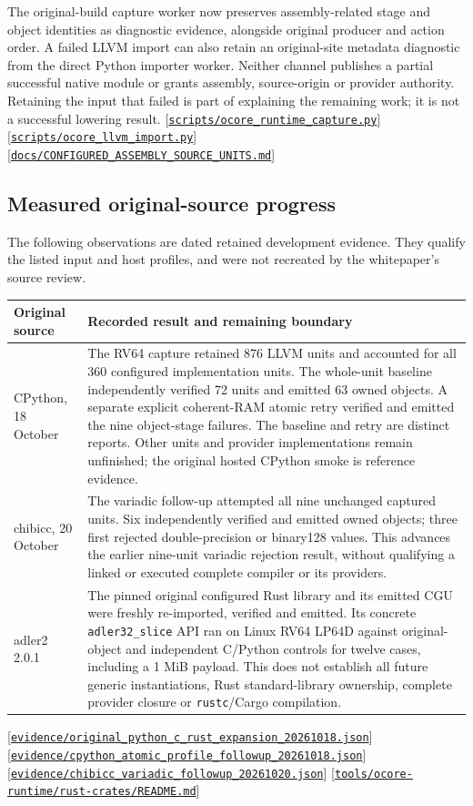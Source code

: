 \documentclass[11pt,oneside]{article}
\newcommand{\src}[1]{\textcolor{OSlate}{\scriptsize[\href{https://github.com/lostadi/OSTADIX/blob/c0b02c326b2329a95ba52447c7180bc93957cd57/#1}{\nolinkurl{#1}}]}\allowbreak}
\begin{document}
The original-build capture worker now preserves assembly-related stage and
object identities as diagnostic evidence, alongside original producer and
action order. A failed LLVM import can also retain an original-site metadata
diagnostic from the direct Python importer worker. Neither channel publishes
a partial successful native module or grants assembly, source-origin or
provider authority. Retaining the input that failed is part of explaining
the remaining work; it is not a successful lowering result.
\src{scripts/ocore_runtime_capture.py}
\src{scripts/ocore_llvm_import.py}
\src{docs/CONFIGURED_ASSEMBLY_SOURCE_UNITS.md}

\subsection{Measured original-source progress}

The following observations are dated retained development evidence. They
qualify the listed input and host profiles, and were not recreated by the
whitepaper's source review.

\begin{longtable}{P{0.19\textwidth} P{0.73\textwidth}}
\toprule
\textbf{Original source} & \textbf{Recorded result and remaining boundary} \\
\midrule
\endhead
CPython, 18 October &
The RV64 capture retained 876 LLVM units and accounted for all 360 configured
implementation units. The whole-unit baseline independently verified 72 units
and emitted 63 owned objects. A separate explicit coherent-RAM atomic retry
verified and emitted the nine object-stage failures. The baseline and retry
are distinct reports. Other units and provider implementations remain
unfinished; the original hosted CPython smoke is reference evidence. \\
\addlinespace
chibicc, 20 October &
The variadic follow-up attempted all nine unchanged captured units. Six
independently verified and emitted owned objects; three first rejected
double-precision or binary128 values. This advances the earlier nine-unit
variadic rejection result, without qualifying a linked or executed complete
compiler or its providers. \\
\addlinespace
adler2 2.0.1 &
The pinned original configured Rust library and its emitted CGU were freshly
re-imported, verified and emitted. Its concrete \texttt{adler32\_slice} API ran
on Linux RV64 LP64D against original-object and independent C/Python controls
for twelve cases, including a 1 MiB payload. This does not establish all
future generic instantiations, Rust standard-library ownership, complete
provider closure or \texttt{rustc}/Cargo compilation. \\
\bottomrule
\end{longtable}
\src{evidence/original_python_c_rust_expansion_20261018.json}
\src{evidence/cpython_atomic_profile_followup_20261018.json}
\src{evidence/chibicc_variadic_followup_20261020.json}
\src{tools/ocore-runtime/rust-crates/README.md}
\end{document}
